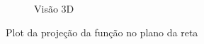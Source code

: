 \documentclass[10pt, a4paper]{article}
\begin{document}
\begin{figure}
\begin{subfigure}[b]{0.5\textwidth}
        \caption{Visão 3D}
        \label{fig:q4_2}
    \end{subfigure}
    \hfill
       \caption{Plot da projeção da função no plano da reta}
       \label{fig:q4}
\end{figure}





\end{document}
